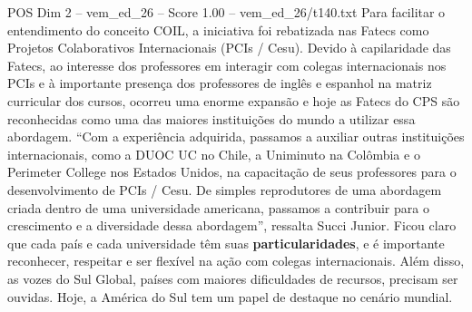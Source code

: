 \begin{textsample}{POS Dim 2 – vem\_ed\_26 – Score 1.00 – vem\_ed\_26/t140.txt}
Para facilitar o entendimento do conceito COIL, a iniciativa foi rebatizada nas Fatecs como Projetos Colaborativos Internacionais (PCIs / Cesu).
Devido à capilaridade das Fatecs, ao interesse dos professores em interagir com colegas internacionais nos PCIs e à importante presença dos professores de inglês e espanhol na matriz curricular dos cursos, ocorreu uma enorme expansão e hoje as Fatecs do CPS são reconhecidas como uma das maiores instituições do mundo a utilizar essa abordagem. “Com a experiência adquirida, passamos a auxiliar outras instituições internacionais, como a DUOC UC no Chile, a Uniminuto na Colômbia e o Perimeter College nos Estados Unidos, na capacitação de seus professores para o desenvolvimento de PCIs / Cesu.
De simples reprodutores de uma abordagem criada dentro de uma universidade americana, passamos a contribuir para o crescimento e a diversidade dessa abordagem”, ressalta Succi Junior.
Ficou claro que cada país e cada universidade têm suas \textbf{particularidades}, e é importante reconhecer, respeitar e ser flexível na ação com colegas internacionais.
Além disso, as vozes do Sul Global, países com maiores dificuldades de recursos, precisam ser ouvidas.
Hoje, a América do Sul tem um papel de destaque no cenário mundial.

\end{textsample}
